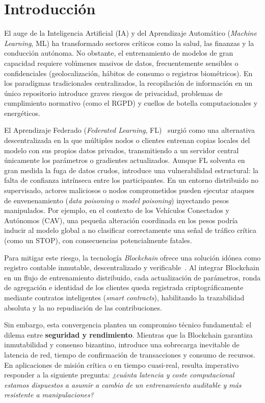 \section{Introducción}
\label{sec:introduccion}

El auge de la Inteligencia Artificial (IA) y del Aprendizaje Automático (\textit{Machine Learning}, ML) ha transformado sectores críticos como la salud, las finanzas y la conducción autónoma. No obstante, el entrenamiento de modelos de gran capacidad requiere volúmenes masivos de datos, frecuentemente sensibles o confidenciales (geolocalización, hábitos de consumo o registros biométricos). En los paradigmas tradicionales centralizados, la recopilación de información en un único repositorio introduce graves riesgos de privacidad, problemas de cumplimiento normativo (como el RGPD) y cuellos de botella computacionales y energéticos.

El Aprendizaje Federado (\textit{Federated Learning}, FL)~\cite{mcmahan2017federated} surgió como una alternativa descentralizada en la que múltiples nodos o clientes entrenan copias locales del modelo con sus propios datos privados, transmitiendo a un servidor central únicamente los parámetros o gradientes actualizados. Aunque FL solventa en gran medida la fuga de datos crudos, introduce una vulnerabilidad estructural: la falta de confianza intrínseca entre los participantes. En un entorno distribuido no supervisado, actores maliciosos o nodos comprometidos pueden ejecutar ataques de envenenamiento (\textit{data poisoning} o \textit{model poisoning}) inyectando pesos manipulados. Por ejemplo, en el contexto de los Vehículos Conectados y Autónomos (CAV), una pequeña alteración coordinada en los pesos podría inducir al modelo global a no clasificar correctamente una señal de tráfico crítica (como un STOP), con consecuencias potencialmente fatales.

Para mitigar este riesgo, la tecnología \textit{Blockchain} ofrece una solución idónea como registro contable inmutable, descentralizado y verificable~\cite{nakamoto2008bitcoin, zheng2018blockchain}. Al integrar Blockchain en un flujo de entrenamiento distribuido, cada actualización de parámetros, ronda de agregación e identidad de los clientes queda registrada criptográficamente mediante contratos inteligentes (\textit{smart contracts}), habilitando la trazabilidad absoluta y la no repudiación de las contribuciones.

Sin embargo, esta convergencia plantea un compromiso técnico fundamental: el dilema entre \textbf{seguridad y rendimiento}. Mientras que la Blockchain garantiza inmutabilidad y consenso bizantino, introduce una sobrecarga inevitable de latencia de red, tiempo de confirmación de transacciones y consumo de recursos. En aplicaciones de misión crítica o en tiempo cuasi-real, resulta imperativo responder a la siguiente pregunta: \textit{¿cuánta latencia y coste computacional estamos dispuestos a asumir a cambio de un entrenamiento auditable y más resistente a manipulaciones?}

